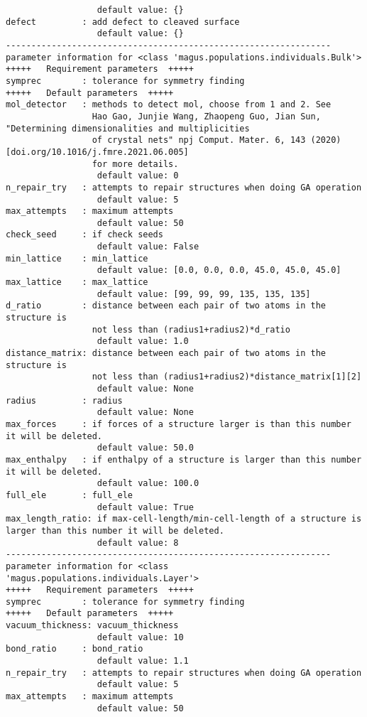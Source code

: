 \documentclass[12pt,oneside]{book}
\begin{document}
\begin{tcolorbox}
\begin{verbatim}
                  default value: {}
defect         : add defect to cleaved surface
                  default value: {}
----------------------------------------------------------------
parameter information for <class 'magus.populations.individuals.Bulk'>
+++++	Requirement parameters	+++++
symprec        : tolerance for symmetry finding
+++++	Default parameters	+++++
mol_detector   : methods to detect mol, choose from 1 and 2. See
                 Hao Gao, Junjie Wang, Zhaopeng Guo, Jian Sun, "Determining dimensionalities and multiplicities
                 of crystal nets" npj Comput. Mater. 6, 143 (2020) [doi.org/10.1016/j.fmre.2021.06.005]
                 for more details.
                  default value: 0
n_repair_try   : attempts to repair structures when doing GA operation
                  default value: 5
max_attempts   : maximum attempts
                  default value: 50
check_seed     : if check seeds
                  default value: False
min_lattice    : min_lattice
                  default value: [0.0, 0.0, 0.0, 45.0, 45.0, 45.0]
max_lattice    : max_lattice
                  default value: [99, 99, 99, 135, 135, 135]
d_ratio        : distance between each pair of two atoms in the structure is
                 not less than (radius1+radius2)*d_ratio
                  default value: 1.0
distance_matrix: distance between each pair of two atoms in the structure is
                 not less than (radius1+radius2)*distance_matrix[1][2]
                  default value: None
radius         : radius
                  default value: None
max_forces     : if forces of a structure larger is than this number it will be deleted.
                  default value: 50.0
max_enthalpy   : if enthalpy of a structure is larger than this number it will be deleted.
                  default value: 100.0
full_ele       : full_ele
                  default value: True
max_length_ratio: if max-cell-length/min-cell-length of a structure is larger than this number it will be deleted.
                  default value: 8
----------------------------------------------------------------
parameter information for <class 'magus.populations.individuals.Layer'>
+++++	Requirement parameters	+++++
symprec        : tolerance for symmetry finding
+++++	Default parameters	+++++
vacuum_thickness: vacuum_thickness
                  default value: 10
bond_ratio     : bond_ratio
                  default value: 1.1
n_repair_try   : attempts to repair structures when doing GA operation
                  default value: 5
max_attempts   : maximum attempts
                  default value: 50

\end{verbatim}
\end{tcolorbox}
\end{document}
